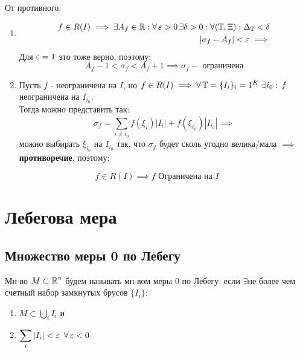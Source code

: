 \documentclass[a4paper, 10pt]{article}
\begin{document}
\proof От противного.
\begin{enumerate}
    \item \begin{equation*}
        \begin{aligned}
            f\in R(I) \implies \exists A_f\in\operatorname{\mathbb{R}} : \forall\operatorname{\varepsilon} > 0 \, \exists\delta > 0: \forall(\operatorname{\mathbb{T}}, \Xi): \Delta_{\operatorname{\mathbb{T}}} < \delta\\
            |\sigma_f-A_f| < \operatorname{\varepsilon} \implies \\
        \end{aligned}
    \end{equation*}
    Для $\operatorname{\varepsilon} = 1$ это тоже верно, поэтому:
    \begin{equation*}
        A_f-1<\sigma_f<A_f+1 \implies \sigma_f - \text{ ограничена}
    \end{equation*}
    \item Пусть $f$ - неограничена на $I$, но $f\in R(I) \implies \forall\operatorname{\mathbb{T}} = \{I_i\}_i=1^K \,\, \exists i_0: \, f$ неограничена на $I_{i_0}$.\\
    Тогда можно представить так: 
    \begin{equation*}
        \sigma_f = \sum_{i\ne i_0}f(\xi_i)|I_i| + f(\xi_{i_0})|I_{i_0}| \implies
    \end{equation*}
    можно выбирать $\xi_{i_0}$ на $I_{i_0}$ так, что $\sigma_f$ будет сколь угодно велика/мала $\implies$ \textbf{противоречие}, поэтому:
\end{enumerate}
\begin{equation*}
    f\in R(I) \implies f \text{ Ограничена на } I
\end{equation*}
\QED

\section{Лебегова мера}
\subsection{Множество меры 0 по Лебегу}
 Мн-во $M\subset\operatorname{\mathbb{R}}^n$ будем называть мн-вом меры 0 по Лебегу, если $\exists$не более чем счетный набор замкнутых брусов $\{I_i\}:$
\begin{enumerate}
    \item $M\subset \displaystyle\bigcup_iI_i$ и 
    \item $\displaystyle\sum_i|I_i| < \ve\,\, \forall \ve < 0$
\end{enumerate}
\end{document}
